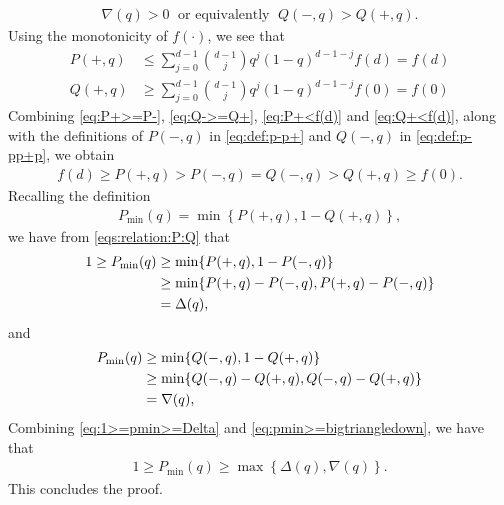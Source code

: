 \documentclass[onecolumn,letterpaper]{IEEEtran}
\newcommand{\cp}{{q}}
\newcommand{\pn}{{P(-,\cp)}}
\newcommand{\pp}{{P(+,\cp)}}
\newcommand{\pmin}{{P_{\min}(\cp)}}
\newcommand{\pgap}{{\Delta(\cp)}}
\newcommand{\pnm}{{Q(-,\cp)}}
\newcommand{\ppm}{{Q(+,\cp)}}
\newcommand{\pgapm}{{\nabla(\cp)}}
\begin{document}
\begin{align}
\label{eq:Q->=Q+}
 \pgapm > 0 \; \text {  or equivalently  }\;  \pnm >  \ppm.
\end{align}
Using the monotonicity of $f(\cdot)$, we see that
\begin{align}
\pp &\le  \sum\limits_{j=0}^{d-1} \binom{d-1}{j} \cp^j (1-\cp)^{d-1-j} f(d)=f(d)  \label{eq:P+<f(d)}\\ 
\ppm &\ge \sum\limits_{j=0}^{d-1} \binom{d-1}{j} \cp^j (1-\cp)^{d-1-j} f(0)=f(0)\label{eq:Q+<f(d)}
\end{align}
Combining \eqref{eq:P+>=P-}, \eqref{eq:Q->=Q+}, \eqref{eq:P+<f(d)} and \eqref{eq:Q+<f(d)}, along with the definitions of $\pn$ in \eqref{eq:def:p-p+} and $\pnm$ in \eqref{eq:def:p-pp+p}, we obtain
\begin{align}
\label{eqs:relation:P:Q}
    f(d)\ge  \pp > \pn = \pnm > \ppm  \ge f(0).
\end{align} 
Recalling the definition
\begin{align}
    \pmin =\min\left\{ \pp,1-\ppm \right\}, \label{eq:def:pmin:repeat}
\end{align} 
we have from \eqref{eqs:relation:P:Q} that
\begin{align}
   1 \geq \pmin &\geq \min\{\pp,1-\pn\} \notag\\
                 &\geq \min\{\pp-\pn,\pp-\pn\} \notag\\
                 &= \pgap, \label{eq:1>=pmin>=Delta}
\end{align}
and 
\begin{align}
\label{eq:pmin>=bigtriangledown}
        \pmin & \geq \min\{\pnm,1-\ppm\} \notag\\
              &\geq\min\{\pnm-\ppm,\pnm-\ppm\} \notag\\
              &=\pgapm,
\end{align}
Combining \eqref{eq:1>=pmin>=Delta} and \eqref{eq:pmin>=bigtriangledown}, we have that
\begin{align*}
     1  \geq  \pmin \geq  \max\left\{\pgap, \pgapm\right\}.
\end{align*}
This concludes the proof.%
\end{document}
